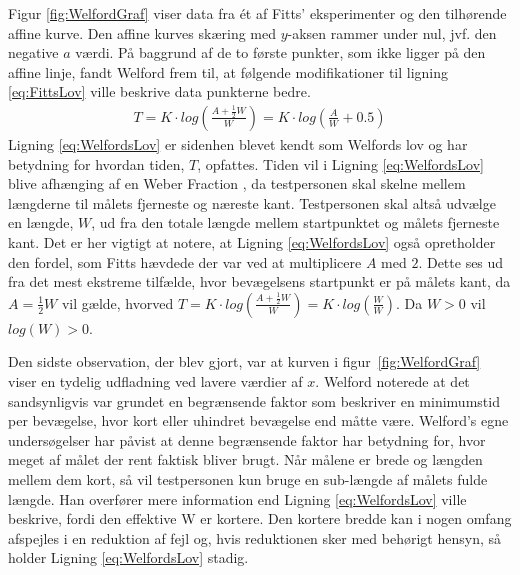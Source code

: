 Figur \ref{fig:WelfordGraf} viser data fra ét af Fitts' eksperimenter og den tilhørende affine kurve. Den affine kurves skæring med $y$-aksen rammer under nul, jvf. den negative $a$ værdi. På baggrund af de to første punkter, som ikke ligger på den affine linje, fandt Welford frem til, at følgende modifikationer til ligning \ref{eq:FittsLov} ville beskrive data punkterne bedre.
\begin{align}\label{eq:WelfordsLov}
T = K \cdot log\left(\frac{A + \frac{1}{2}W}{W}\right) = K \cdot log\left(\frac{A}{W} + 0.5\right)
\end{align}
Ligning \ref{eq:WelfordsLov} er sidenhen blevet kendt som Welfords lov og har betydning for hvordan tiden, $T$, opfattes. Tiden vil i Ligning \ref{eq:WelfordsLov} blive afhænging af en Weber Fraction \cite{welford1958}, da testpersonen skal skelne mellem længderne til målets fjerneste og næreste kant. Testpersonen skal altså udvælge en længde, $W$, ud fra den totale længde mellem startpunktet og målets fjerneste kant. Det er her vigtigt at notere, at Ligning \ref{eq:WelfordsLov} også opretholder den fordel, som Fitts hævdede der var ved at multiplicere $A$ med $2$. Dette ses ud fra det mest ekstreme tilfælde, hvor bevægelsens startpunkt er på målets kant, da $A = \frac{1}{2}W$ vil gælde, hvorved $T = K \cdot log\left(\frac{A + \frac{1}{2}W}{W}\right) = K \cdot log\left(\frac{W}{W}\right)$. Da $W > 0$ vil $log(W) > 0$.

Den sidste observation, der blev gjort, var at kurven i figur~\ref{fig:WelfordGraf} viser en tydelig udfladning ved lavere værdier af $x$. Welford noterede at det sandsynligvis var grundet en begrænsende faktor som beskriver en minimumstid per bevægelse, hvor kort eller uhindret bevægelse end måtte være. Welford's egne undersøgelser har påvist at denne begrænsende faktor har betydning for, hvor meget af målet der rent faktisk bliver brugt. Når målene er brede og længden mellem dem kort, så vil testpersonen kun bruge en sub-længde af målets fulde længde. Han overfører mere information end Ligning \ref{eq:WelfordsLov} ville beskrive, fordi den effektive W er kortere. Den kortere bredde kan i nogen omfang afspejles i en reduktion af fejl og, hvis reduktionen sker med behørigt hensyn, så holder Ligning \ref{eq:WelfordsLov} stadig.

